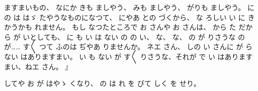 ますまいもの、
なにか
きも
ましやう、
みも
ましやう、
がりも
ましやう。
に
の
は
はゞ
たやうなものになつて、
にやあ
との
づくから、
な
ろしい
い
に
き
かうかも
れません。
もし
なつたところで
お
さんや
お
さんは、
から
た
だから
が
いとしても、
に
も
い
は
ない
の
の
い、
な、
な、
の
が
りさうな
の
が……
す〳〵
つて
ふのは
ぢやあ
りませんか。
ネエ
さん、
しの
い
さんに
が
らない
はありますまい。
い
も
ない
が
す〳〵
りさうな、それが
で
い
はありますまい、ねエ
さん。
』

してや
お
が
はやゝ
くなり、
の
は
れ
を
びて
しく
を
せり。

